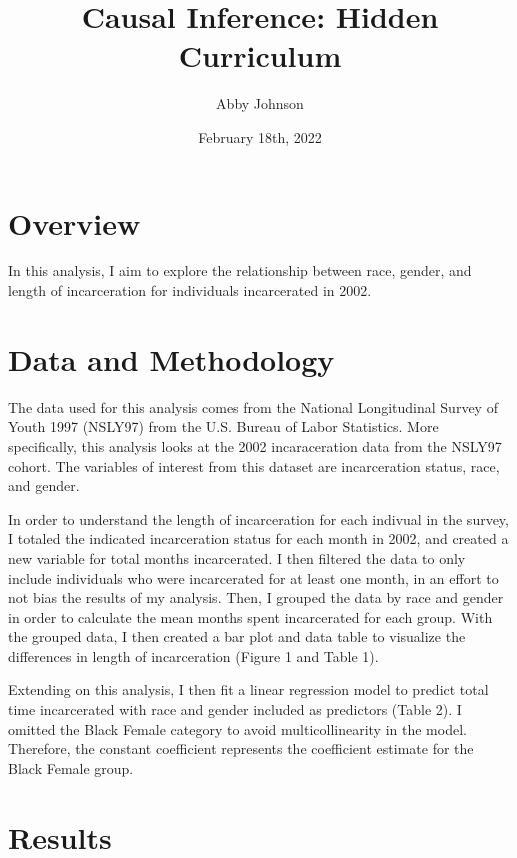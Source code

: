 \documentclass{article}
\author{Abby Johnson}
\title{Causal Inference: Hidden Curriculum}
\date{February 18th, 2022}
\begin{document}
\maketitle

\section{Overview}

In this analysis, I aim to explore the relationship between race, gender, and length of incarceration for individuals incarcerated in 2002.


\section{Data and Methodology}

The data used for this analysis comes from the National Longitudinal Survey of Youth 1997 (NSLY97) from the U.S. Bureau of Labor Statistics. More specifically, this analysis looks at the 2002 incaraceration data from the NSLY97 cohort. The variables of interest from this dataset are incarceration status, race, and gender.

In order to understand the length of incarceration for each indivual in the survey, I totaled the indicated incarceration status for each month in 2002, and created a new variable for total months incarcerated. I then filtered the data to only include individuals who were incarcerated for at least one month, in an effort to not bias the results of my analysis.
Then, I grouped the data by race and gender in order to calculate the mean months spent incarcerated for each group. With the grouped data, I then created a bar plot and data table to visualize the differences in length of incarceration (Figure 1 and Table 1). 

Extending on this analysis, I then fit a linear regression model to predict total time incarcerated with race and gender included as predictors (Table 2). I omitted the Black Female category to avoid multicollinearity in the model. Therefore, the constant coefficient represents the coefficient estimate for the Black Female group. 

\newpage
\section{Results}
\end{document}
